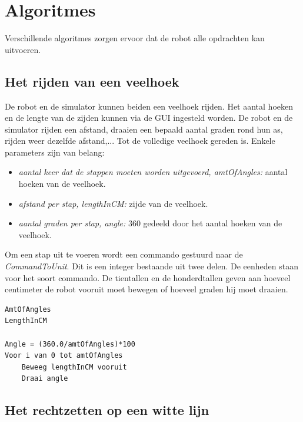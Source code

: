 \documentclass[tt3]{penoverslag}
\begin{document}
\section{Algoritmes} %
\label{sec:algo}
Verschillende algoritmes zorgen ervoor dat de robot alle opdrachten kan uitvoeren.

\subsection{Het rijden van een veelhoek} %
\label{ssec:algoVeelH}
De robot en de simulator kunnen beiden een veelhoek rijden. Het aantal hoeken en de lengte van de zijden kunnen via de GUI ingesteld worden. De robot en de simulator rijden een afstand, draaien een bepaald aantal graden rond hun as, rijden weer dezelfde afstand,... Tot de volledige veelhoek gereden is. Enkele parameters zijn van belang:

\begin{itemize}
\item \textit{aantal keer dat de stappen moeten worden uitgevoerd, amtOfAngles:} aantal hoeken van de veelhoek.
\item \textit{afstand per stap, lengthInCM:} zijde van de veelhoek.
\item \textit{aantal graden per stap, angle:} 360 gedeeld door het aantal hoeken van de veelhoek.
\end{itemize}

Om een stap uit te voeren wordt een commando gestuurd naar de \textit{CommandToUnit}. Dit is een integer bestaande uit twee delen. De eenheden staan voor het soort commando. De tientallen en de honderdtallen geven aan hoeveel centimeter de robot vooruit moet bewegen of hoeveel graden hij moet draaien.

\lstset{frame=single, language=Java, caption=Veelhoek algoritme (pseudocode),
    	label=code:algoVeelH, numbers=left, numberstyle=\footnotesize,
		basicstyle=\sffamily, numbersep=5pt}
\begin{lstlisting}
AmtOfAngles
LengthInCM

Angle = (360.0/amtOfAngles)*100
Voor i van 0 tot amtOfAngles
	Beweeg lengthInCM vooruit
	Draai angle
\end{lstlisting}


\subsection{Het rechtzetten op een witte lijn} %
\label{ssec:algoWitteL}
\end{document}
